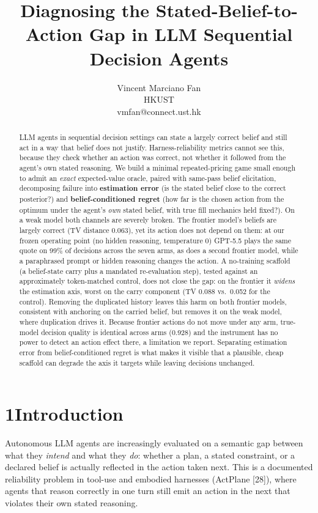 \documentclass[
  10pt,
]{article}
\title{Diagnosing the Stated-Belief-to-Action Gap in LLM Sequential Decision Agents}
\author{Vincent Marciano Fan\\
HKUST\\
vmfan@connect.ust.hk}
\date{}
\begin{document}
\maketitle
\begin{abstract}
LLM agents in sequential decision settings can state a largely correct belief and still act in a way that belief does not justify. Harness-reliability metrics cannot see this, because they check whether an action was correct, not whether it followed from the agent's own stated reasoning. We build a minimal repeated-pricing game small enough to admit an \emph{exact} expected-value oracle, paired with same-pass belief elicitation, decomposing failure into \textbf{estimation error} (is the stated belief close to the correct posterior?) and \textbf{belief-conditioned regret} (how far is the chosen action from the optimum under the agent's \emph{own} stated belief, with true fill mechanics held fixed?). On a weak model both channels are severely broken. The frontier model's beliefs are largely correct (TV distance 0.063), yet its action does not depend on them: at our frozen operating point (no hidden reasoning, temperature 0) GPT-5.5 plays the same quote on 99\% of decisions across the seven arms, as does a second frontier model, while a paraphrased prompt or hidden reasoning changes the action. A no-training scaffold (a belief-state carry plus a mandated re-evaluation step), tested against an approximately token-matched control, does not close the gap: on the frontier it \emph{widens} the estimation axis, worst on the carry component (TV 0.088 vs.~0.052 for the control). Removing the duplicated history leaves this harm on both frontier models, consistent with anchoring on the carried belief, but removes it on the weak model, where duplication drives it. Because frontier actions do not move under any arm, true-model decision quality is identical across arms (0.928) and the instrument has no power to detect an action effect there, a limitation we report. Separating estimation error from belief-conditioned regret is what makes it visible that a plausible, cheap scaffold can degrade the axis it targets while leaving decisions unchanged.
\end{abstract}

\section{1\quad Introduction}\label{introduction}

Autonomous LLM agents are increasingly evaluated on a semantic gap between what they \emph{intend} and what they \emph{do}: whether a plan, a stated constraint, or a declared belief is actually reflected in the action taken next. This is a documented reliability problem in tool-use and embodied harnesses (ActPlane {[}28{]}), where agents that reason correctly in one turn still emit an action in the next that violates their own stated reasoning.
\end{document}
